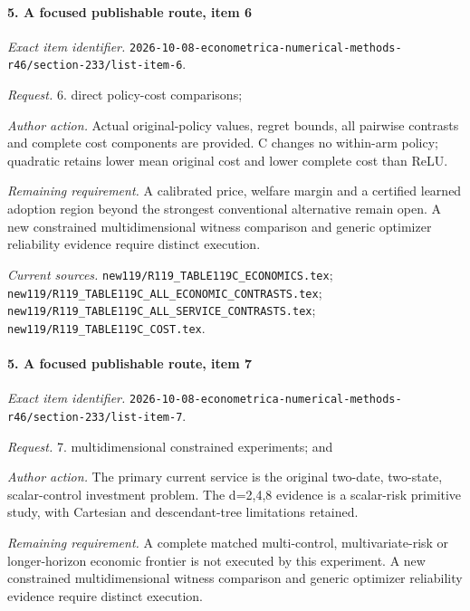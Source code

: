 \paragraph{5. A focused publishable route, item 6}

\emph{Exact item identifier.} \nolinkurl{2026-10-08-econometrica-numerical-methods-r46/section-233/list-item-6}.

\par\emph{Request.} 6. direct policy-cost comparisons;

\par\emph{Author action.} Actual original-policy values, regret bounds, all pairwise contrasts and complete cost components are provided. C changes no within-arm policy; quadratic retains lower mean original cost and lower complete cost than ReLU.

\par\emph{Remaining requirement.} A calibrated price, welfare margin and a certified learned adoption region beyond the strongest conventional alternative remain open. A new constrained multidimensional witness comparison and generic optimizer reliability evidence require distinct execution.

\par\emph{Current sources.} \nolinkurl{new119/R119_TABLE119C_ECONOMICS.tex}; \nolinkurl{new119/R119_TABLE119C_ALL_ECONOMIC_CONTRASTS.tex}; \nolinkurl{new119/R119_TABLE119C_ALL_SERVICE_CONTRASTS.tex}; \nolinkurl{new119/R119_TABLE119C_COST.tex}.

\paragraph{5. A focused publishable route, item 7}

\emph{Exact item identifier.} \nolinkurl{2026-10-08-econometrica-numerical-methods-r46/section-233/list-item-7}.

\par\emph{Request.} 7. multidimensional constrained experiments; and

\par\emph{Author action.} The primary current service is the original two-date, two-state, scalar-control investment problem. The d=2,4,8 evidence is a scalar-risk primitive study, with Cartesian and descendant-tree limitations retained.

\par\emph{Remaining requirement.} A complete matched multi-control, multivariate-risk or longer-horizon economic frontier is not executed by this experiment. A new constrained multidimensional witness comparison and generic optimizer reliability evidence require distinct execution.

